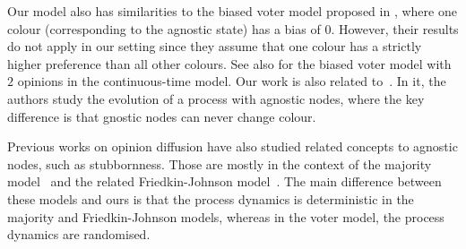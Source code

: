 Our model also has similarities to the biased voter model proposed in \cite{george}, where one colour (corresponding to the agnostic state) has a bias of $0$. However, their results do not apply in our setting since they assume that one colour has a strictly higher preference than all other colours. See also \cite{Lanchier_Neuhauser_2007} for the biased voter model with $2$ opinions in the continuous-time model. Our work is also related to~\cite{zehmakan2024viral}. In it, the authors study the evolution of a process with agnostic nodes, where the key difference is that gnostic nodes can never change colour. 

Previous works on opinion diffusion have also studied related concepts to agnostic nodes, such as stubbornness. Those are mostly in the context of the majority model~\cite{auletta2017information,out2021majority} and the related Friedkin-Johnson model~\cite{xu2022effects, shirzadi2024stubborn}. The main difference between these models and ours is that the process dynamics is deterministic in the majority and Friedkin-Johnson models, whereas in the voter model, the process dynamics are randomised.